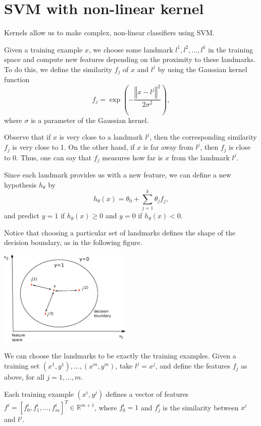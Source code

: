 \documentclass[a4paper,11pt]{report}
\newcommand{\norm}[1]{\left\Vert#1\right\Vert}
\newcommand{\ds}{\displaystyle}
\begin{document}
\section{SVM with non-linear kernel}

Kernels allow us to make complex, non-linear classifiers using SVM.

Given a training example $x$, we choose some landmark $l^{1}, l^{2}, \ldots, l^{k}$ in the training space and compute new features depending on the proximity to these landmarks. To do this, we define the similarity $f_j$ of $x$ and $l^{j}$ by using the Gaussian kernel function
$$f_j = \ds\exp\left(-\frac{\norm{x - l^{j}}^2}{2\sigma^2}\right),$$
where $\sigma$ is a parameter of the Gaussian kernel.

Observe that if $x$ is very close to a landmark $l^{j}$, then the corresponding similarity $f_j$ is very close to 1. On the other hand, if $x$ is far away from $l^{j}$, then $f_j$ is close to 0. Thus, one can say that $f_j$ measures how far is $x$ from the landmark $l^{j}$.

Since each landmark provides us with a new feature, we can define a new hypothesis $h_\theta$ by
$$h_\theta(x) = \theta_0 + \ds\sum_{j=1}^{k}{\theta_j f_j},$$
and predict $y=1$ if $h_\theta(x) \ge 0$ and $y=0$ if $h_\theta(x) < 0$.

Notice that choosing a particular set of landmarks defines the shape of the decision boundary, as in the following figure.

\hspace{1.0in}
\begin{center}
\includegraphics[height = 1.8in]{ml_images/kernel}
\end{center}

We can choose the landmarks to be exactly the training examples. Given a training set $(x^1, y^1), \ldots, (x^m, y^m)$, take $l^{j} = x^j$, and define the features $f_j$ as above, for all $j=1, \ldots, m$.

Each training example $(x^i, y^j)$ defines a vector of features $f^i = [f^i_0, f^i_1, \ldots, f^i_m]^T \in \mathbb{R}^{m+1}$, where $f^i_0 = 1$ and $f^i_j$ is the similarity between $x^i$ and $l^j$.
\end{document}
